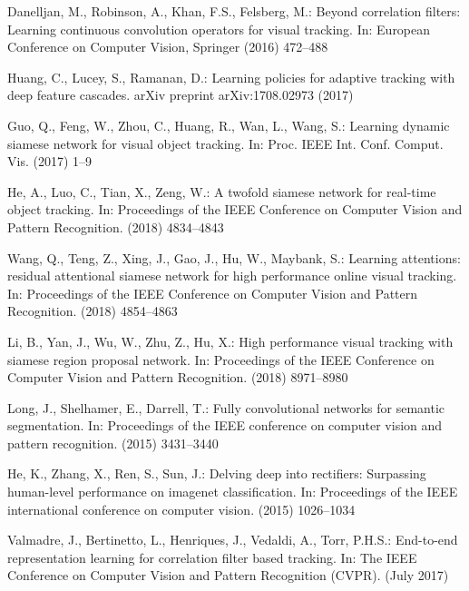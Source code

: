 \documentclass[runningheads]{llncs}
\begin{document}
\begin{thebibliography}{10}
Danelljan, M., Robinson, A., Khan, F.S., Felsberg, M.:
\newblock Beyond correlation filters: Learning continuous convolution operators
  for visual tracking.
\newblock In: European Conference on Computer Vision, Springer (2016)  472--488

Huang, C., Lucey, S., Ramanan, D.:
\newblock Learning policies for adaptive tracking with deep feature cascades.
\newblock arXiv preprint arXiv:1708.02973 (2017)

Guo, Q., Feng, W., Zhou, C., Huang, R., Wan, L., Wang, S.:
\newblock Learning dynamic siamese network for visual object tracking.
\newblock In: Proc. IEEE Int. Conf. Comput. Vis. (2017)  1--9

He, A., Luo, C., Tian, X., Zeng, W.:
\newblock A twofold siamese network for real-time object tracking.
\newblock In: Proceedings of the IEEE Conference on Computer Vision and Pattern
  Recognition. (2018)  4834--4843

Wang, Q., Teng, Z., Xing, J., Gao, J., Hu, W., Maybank, S.:
\newblock Learning attentions: residual attentional siamese network for high
  performance online visual tracking.
\newblock In: Proceedings of the IEEE Conference on Computer Vision and Pattern
  Recognition. (2018)  4854--4863

Li, B., Yan, J., Wu, W., Zhu, Z., Hu, X.:
\newblock High performance visual tracking with siamese region proposal
  network.
\newblock In: Proceedings of the IEEE Conference on Computer Vision and Pattern
  Recognition. (2018)  8971--8980

Long, J., Shelhamer, E., Darrell, T.:
\newblock Fully convolutional networks for semantic segmentation.
\newblock In: Proceedings of the IEEE conference on computer vision and pattern
  recognition. (2015)  3431--3440

He, K., Zhang, X., Ren, S., Sun, J.:
\newblock Delving deep into rectifiers: Surpassing human-level performance on
  imagenet classification.
\newblock In: Proceedings of the IEEE international conference on computer
  vision. (2015)  1026--1034

Valmadre, J., Bertinetto, L., Henriques, J., Vedaldi, A., Torr, P.H.S.:
\newblock End-to-end representation learning for correlation filter based
  tracking.
\newblock In: The IEEE Conference on Computer Vision and Pattern Recognition
  (CVPR). (July 2017)


\end{thebibliography}
\end{document}
